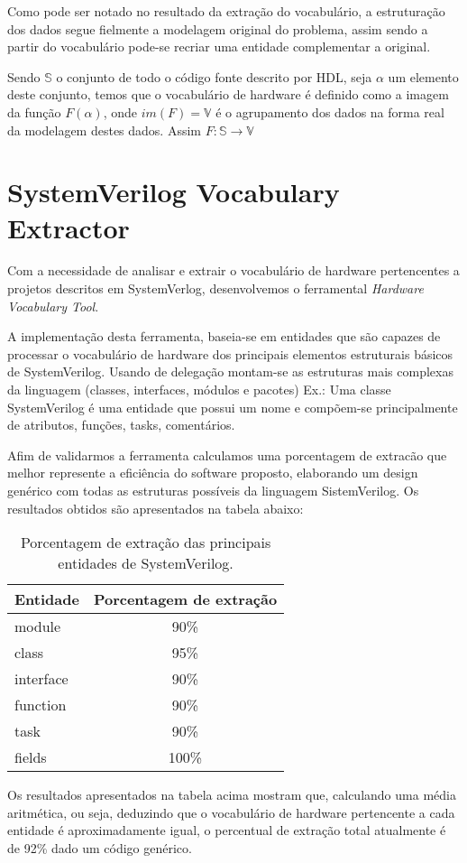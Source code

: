 \documentclass[12pt, twocolumn, a4paper]{article}
\begin{document}
Como pode ser notado no resultado da extração do vocabulário, a estruturação dos dados segue fielmente a modelagem original do problema, assim sendo a partir do vocabulário pode-se recriar uma entidade complementar a original.

Sendo $\mathbb{S}$ o conjunto de todo o código fonte descrito por HDL, seja $\alpha$ um elemento deste conjunto, temos que o vocabulário de hardware é definido como  a imagem da função $F(\alpha)$, onde $im(F) = \mathbb{V}$ é o agrupamento dos dados na forma real da modelagem destes dados. Assim $F: \mathbb{S}\rightarrow\mathbb{V}$

	\section{SystemVerilog Vocabulary Extractor}

\quad Com a necessidade de analisar e extrair o vocabulário de hardware pertencentes a projetos descritos em SystemVerlog, desenvolvemos o ferramental \textit{Hardware Vocabulary Tool}.

A implementação desta ferramenta, baseia-se em entidades que são capazes de processar o vocabulário de hardware dos principais elementos estruturais básicos de SystemVerilog. Usando de delegação montam-se as estruturas mais complexas da linguagem (classes, interfaces, módulos e pacotes) Ex.: Uma classe SystemVerilog é uma entidade que possui um nome e compõem-se principalmente de atributos, funções, tasks, comentários.
	
Afim de validarmos a ferramenta calculamos uma porcentagem de extracão que melhor represente a eficiência do software proposto, elaborando um design genérico com todas as estruturas possíveis da linguagem SistemVerilog. Os resultados obtidos são apresentados na tabela abaixo:

\begin{table}[h]
\centering
\caption{Porcentagem de extração das principais entidades de SystemVerilog.}
	\begin{tabular}{l|c}
	\hline
	Entidade  & Porcentagem de extração\\
	\hline
	module     & 90\% \\
	\hline
	class 	   & 95\% \\
	\hline
	interface  & 90\% \\
	\hline
	function   & 90\% \\
	\hline
	task       & 90\% \\
	\hline
	fields     & 100\% \\
	\hline
	
	\end{tabular}

\end{table}
Os resultados apresentados na tabela acima mostram que, calculando uma média aritmética, ou seja, deduzindo que o vocabulário de hardware pertencente a cada entidade é aproximadamente igual, o percentual de extração total atualmente é de 92\% dado um código genérico.
\end{document}
